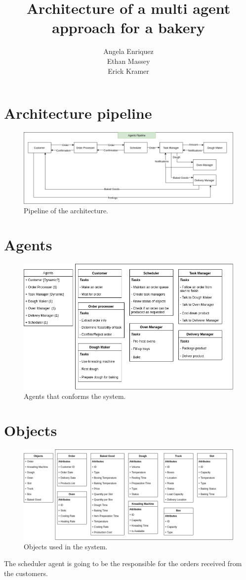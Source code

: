 \documentclass[a4paper]{article}
\title{Architecture of a multi agent approach for a bakery}
\author{Angela Enriquez\\
	    Ethan Massey\\
	    Erick Kramer}
\begin{document}
	\maketitle
	\newpage
	\section{Architecture pipeline}
	
	\begin{figure}[h!]
		\includegraphics[scale=0.4]{img/architecture-pipeline.png}
		\caption{Pipeline of the architecture.}
	\end{figure}
	
	\section{Agents}
	
	\begin{figure}[h!]
		\includegraphics[scale=0.5]{img/architecture-Agents.png}
		\caption{Agents that conforms the system.}
	\end{figure}
	\newpage
	\section{Objects}
	
	\begin{figure}[h!]
		\includegraphics[scale=0.4]{img/architecture-Objects.png}
		\caption{Objects used in the system.}
	\end{figure}
	
	The scheduler agent is going to be the responsible for the orders received from the customers. 
\end{document}
